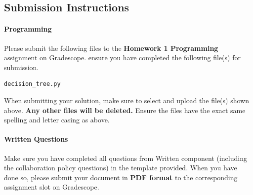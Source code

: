 \newpage
\subsection{Submission Instructions}
\paragraph{Programming}
Please submit the following files to the \textbf{Homework 1 Programming} assignment on Gradescope. ensure you have completed the following file(s) for submission.

\begin{verbatim}
decision_tree.py
\end{verbatim}

When submitting your solution, make sure to select and upload the file(s) shown above. \textbf{Any other files will be deleted.} Ensure the files have the exact same spelling and letter casing as above. 

\paragraph{Written Questions}
Make sure you have completed all questions from Written component (including the collaboration policy questions) in the template provided.  When you have done so, please submit your document in \textbf{PDF format} to the corresponding assignment slot on Gradescope.




